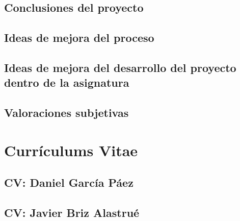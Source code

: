 \documentclass[10pt,spanish]{article}
\let\stdsection\section
\renewcommand\section{\newpage\stdsection}
\begin{document}
\subsection{Conclusiones del proyecto}


\subsection{Ideas de mejora del proceso}


\subsection{Ideas de mejora del desarrollo del proyecto dentro de la asignatura}


\subsection{Valoraciones subjetivas}


\appendix


\section{Currículums Vitae}


\subsection{CV: Daniel García Páez}


\subsection{CV: Javier Briz Alastrué}

\end{document}
